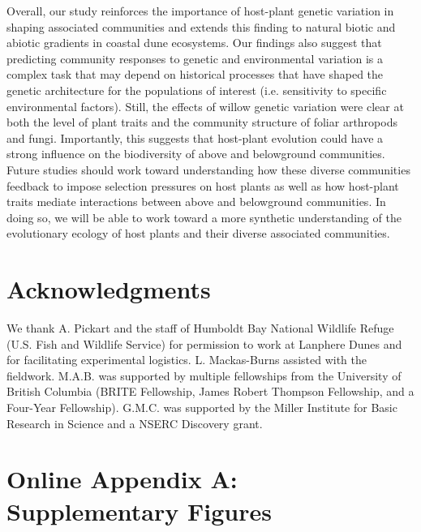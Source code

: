 \documentclass[11pt]{article}
\begin{document}
Overall, our study reinforces the importance of host-plant genetic
variation in shaping associated communities and extends this finding to
natural biotic and abiotic gradients in coastal dune ecosystems. Our
findings also suggest that predicting community responses to genetic and
environmental variation is a complex task that may depend on historical
processes that have shaped the genetic architecture for the populations
of interest (i.e. sensitivity to specific environmental factors). Still,
the effects of willow genetic variation were clear at both the level of
plant traits and the community structure of foliar arthropods and fungi.
Importantly, this suggests that host-plant evolution could have a strong
influence on the biodiversity of above and belowground communities.
Future studies should work toward understanding how these diverse
communities feedback to impose selection pressures on host plants as
well as how host-plant traits mediate interactions between above and
belowground communities. In doing so, we will be able to work toward a
more synthetic understanding of the evolutionary ecology of host plants
and their diverse associated communities.


\section*{Acknowledgments}

We thank A. Pickart and the staff of Humboldt Bay National Wildlife
Refuge (U.S. Fish and Wildlife Service) for permission to work at
Lanphere Dunes and for facilitating experimental logistics. L.
Mackas-Burns assisted with the fieldwork. M.A.B. was supported by
multiple fellowships from the University of British Columbia (BRITE
Fellowship, James Robert Thompson Fellowship, and a Four-Year
Fellowship). G.M.C. was supported by the Miller Institute for Basic
Research in Science and a NSERC Discovery grant.

\newpage{}

\renewcommand{\thesection}{\Alph{section}}

\section*{Online Appendix A: Supplementary Figures}
\end{document}
